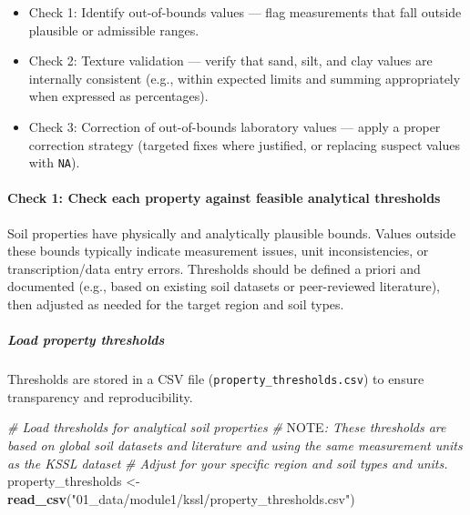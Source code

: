 \documentclass[
  10pt,
  b5paper,
  oneside]{book}
\newenvironment{Shaded}{\begin{snugshade}}{\end{snugshade}}
\newcommand{\AlertTok}[1]{\textcolor[rgb]{0.94,0.16,0.16}{#1}}
\newcommand{\CommentTok}[1]{\textcolor[rgb]{0.56,0.35,0.01}{\textit{#1}}}
\newcommand{\FunctionTok}[1]{\textcolor[rgb]{0.13,0.29,0.53}{\textbf{#1}}}
\newcommand{\NormalTok}[1]{#1}
\newcommand{\OtherTok}[1]{\textcolor[rgb]{0.56,0.35,0.01}{#1}}
\newcommand{\StringTok}[1]{\textcolor[rgb]{0.31,0.60,0.02}{#1}}
\begin{document}
\begin{itemize}
\item
  Check 1: Identify out-of-bounds values --- flag measurements that fall outside plausible or admissible ranges.
\item
  Check 2: Texture validation --- verify that sand, silt, and clay values are internally consistent (e.g., within expected limits and summing appropriately when expressed as percentages).
\item
  Check 3: Correction of out-of-bounds laboratory values --- apply a proper correction strategy (targeted fixes where justified, or replacing suspect values with \texttt{NA}).
\end{itemize}

\paragraph*{Check 1: Check each property against feasible analytical thresholds}\label{check-1-check-each-property-against-feasible-analytical-thresholds}

Soil properties have physically and analytically plausible bounds. Values outside these bounds typically indicate measurement issues, unit inconsistencies, or transcription/data entry errors. Thresholds should be defined a priori and documented (e.g., based on existing soil datasets or peer-reviewed literature), then adjusted as needed for the target region and soil types.

\subparagraph*{Load property thresholds}\label{load-property-thresholds}

Thresholds are stored in a CSV file (\texttt{property\_thresholds.csv}) to ensure transparency and reproducibility.

\begin{Shaded}
\begin{Highlighting}[]
\CommentTok{\# Load thresholds for analytical soil properties}
\CommentTok{\# }\AlertTok{NOTE}\CommentTok{: These thresholds are based on global soil datasets and literature and using the same measurement units as the KSSL dataset}
\CommentTok{\#       Adjust for your specific region and soil types and units.}
\NormalTok{property\_thresholds }\OtherTok{\textless{}{-}} \FunctionTok{read\_csv}\NormalTok{(}\StringTok{"01\_data/module1/kssl/property\_thresholds.csv"}\NormalTok{)}
\end{Highlighting}
\end{Shaded}
\end{document}

